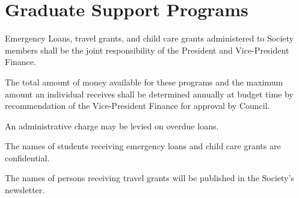 \section{Graduate Support Programs}
\begin{longenum}[ label*=\thesection.\arabic*., align=left]
	\item Emergency Loans, travel grants, and child care grants administered to Society members shall be the joint responsibility of the President and Vice-President Finance.
    \item The total amount of money available for these programs and the maximum amount an individual receives shall be determined annually at budget time by recommendation of the Vice-President Finance for approval by Council.
    \item An administrative charge may be levied on overdue loans.
    \item The names of students receiving emergency loans and child care grants are confidential.
    \item The names of persons receiving travel grants will be published in the  Society's newsletter.
\end{longenum}
\newpage

